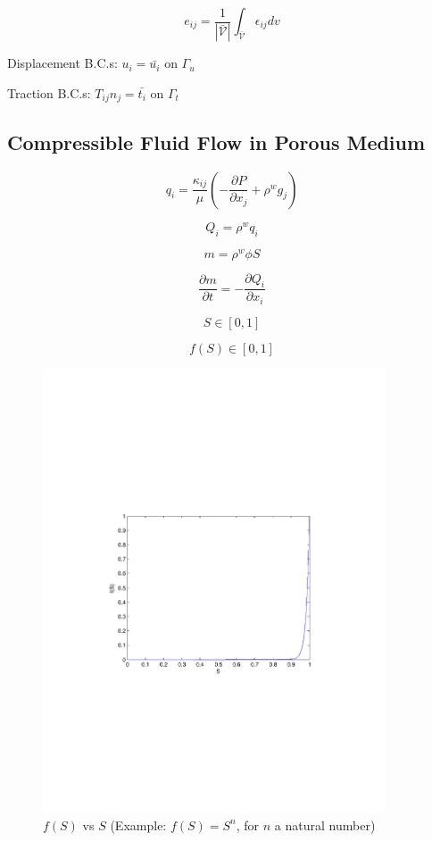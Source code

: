 \documentclass[11pt]{article} %
\begin{document}
\begin{equation}
	e_{ij} = \frac{1}{|\bar{\mathcal{V}}|} \int_{\bar{\mathcal{V}}} \epsilon_{ij} dv
\end{equation}

Displacement B.C.s: $u_i = \bar{u_i}$ on $\Gamma_u$

Traction B.C.s: $T_{ij} n_j = \bar{t_i}$ on $\Gamma_t$

\subsection{Compressible Fluid Flow in Porous Medium}

\begin{equation}
	q_i = \frac{\kappa_{ij}}{\mu}\left(-\frac{\partial P}{\partial x_j}+\rho^w g_j\right)
\end{equation}

\begin{equation}
	Q_i = \rho^w q_i
\end{equation}

\begin{equation}
	m = \rho^w \phi S
\end{equation}

\begin{equation}
	\frac{\partial m}{\partial t} = - \frac{\partial Q_i}{\partial x_i}
\end{equation}

\begin{equation}
	S \in \left[ 0, 1 \right]
\end{equation}

\begin{equation}
	f(S) \in \left[ 0, 1 \right]
\end{equation}

\begin{figure}
	\centering
	\includegraphics[width =4in,trim=110 240 130 240,clip=true]{fofs.pdf}
	\caption{$f(S)$ vs $S$ (Example: $f(S) = S^n$, for $n$ a natural number)}
\end{figure}
\end{document}
